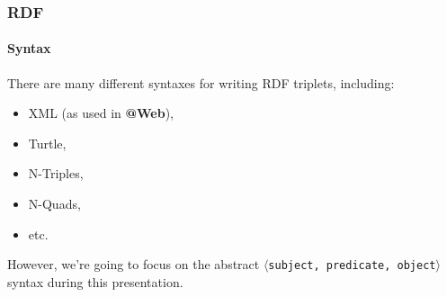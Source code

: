 \documentclass{beamer}
\makeatletter
\newcommand{\atweb}{\textbf{@Web}\xspace}
\newcommand{\triplet}[1]{$\langle$\texttt{#1}$\rangle$}
\makeatother
\begin{document}
\begin{frame}
  \frametitle{RDF}
  \framesubtitle{Syntax}

  There are many different syntaxes for writing RDF triplets, including:

  \pause

  \begin{itemize}
    \item XML (as used in \atweb),

    \pause

    \item Turtle,
    \item N-Triples,
    \item N-Quads,
    \item etc.
  \end{itemize}

  \pause

  However, we're going to focus on the abstract \triplet{subject, predicate,
  object} syntax during this presentation.
\end{frame}

\begin{frame}
  \frametitle{}
\end{frame}

\begin{frame}
  \frametitle{}
\end{frame}

\begin{frame}
  \frametitle{}
\end{frame}

\begin{frame}
  \frametitle{}
\end{frame}

\begin{frame}
  \frametitle{}
\end{frame}
\end{document}
